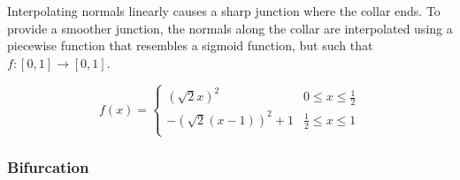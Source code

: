 \documentclass[10pt]{article}
\begin{document}
Interpolating normals linearly causes a sharp junction where the collar ends. To provide a smoother junction, the normals along the collar are interpolated using a piecewise function that resembles a sigmoid function, but such that $ f: \left[ 0, 1 \right] \rightarrow \left[ 0, 1 \right] $.

\[ f(x) =
\begin{cases}
(\sqrt{2}x)^2 & 0 \leq x \leq \frac{1}{2}\\
-\left(\sqrt{2}(x-1)\right)^2 + 1 & \frac{1}{2} \leq x \leq 1 \\
\end{cases} \]

\subsubsection{Bifurcation}
\end{document}
